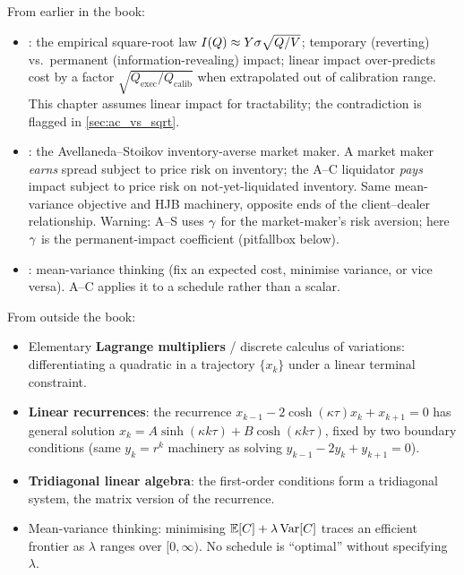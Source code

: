 \begin{backgroundbox}[Prerequisites]
From earlier in the book:
\begin{itemize}
  \item {}: the empirical square-root law
  $I(Q) \approx Y\sigma\sqrt{Q/V}$; temporary (reverting) vs.\
  permanent (information-revealing) impact; linear impact
  over-predicts cost by a factor
  $\sqrt{Q_{\text{exec}}/Q_{\text{calib}}}$ when extrapolated out
  of calibration range. This chapter assumes linear impact for
  tractability; the contradiction is flagged in
  \cref{sec:ac_vs_sqrt}.
  \item {}: the Avellaneda--Stoikov
  inventory-averse market maker. A market maker \emph{earns}
  spread subject to price risk on inventory; the A--C
  liquidator \emph{pays} impact subject to price risk on
  not-yet-liquidated inventory. Same mean-variance objective
  and HJB machinery, opposite ends of the client--dealer
  relationship. Warning: A--S uses $\gamma$ for the
  market-maker's risk aversion; here $\gamma$ is the
  permanent-impact coefficient (pitfallbox below).
  \item {}: mean-variance thinking
  (fix an expected cost, minimise variance, or vice versa). A--C
  applies it to a schedule rather than a scalar.
\end{itemize}
From outside the book:
\begin{itemize}
  \item Elementary \textbf{Lagrange multipliers} / discrete
  calculus of variations: differentiating a quadratic in a
  trajectory $\{x_k\}$ under a linear terminal constraint.
  \item \textbf{Linear recurrences}: the recurrence
  $x_{k-1} - 2\cosh(\kappa\tau)x_k + x_{k+1} = 0$ has general
  solution $x_k = A\sinh(\kappa k\tau) + B\cosh(\kappa k\tau)$,
  fixed by two boundary conditions (same $y_k = r^k$ machinery
  as solving $y_{k-1} - 2 y_k + y_{k+1} = 0$).
  \item \textbf{Tridiagonal linear algebra}: the first-order
  conditions form a tridiagonal system, the matrix version of
  the recurrence.
  \item Mean-variance thinking: minimising $\mathbb{E}[C] + \lambda\operatorname{Var}[C]$
  traces an efficient frontier as $\lambda$ ranges over
  $[0,\infty)$. No schedule is ``optimal'' without specifying
  $\lambda$.
\end{itemize}
\end{backgroundbox}

